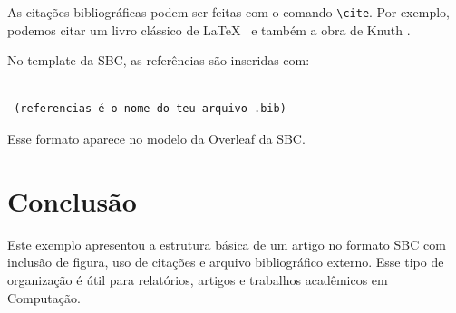 \documentclass[12pt]{article}
\begin{document}
As citações bibliográficas podem ser feitas com o comando \texttt{\textbackslash cite}. Por exemplo, podemos citar um livro clássico de \LaTeX\ \cite{lamport1994} e também a obra de Knuth \cite{knuth1984}.

No template da SBC, as referências são inseridas com:

\begin{verbatim}

 (referencias é o nome do teu arquivo .bib)
\end{verbatim}

Esse formato aparece no modelo da Overleaf da SBC.

\section{Conclusão}

Este exemplo apresentou a estrutura básica de um artigo no formato SBC com inclusão de figura, uso de citações e arquivo bibliográfico externo. Esse tipo de organização é útil para relatórios, artigos e trabalhos acadêmicos em Computação.



\end{document}
